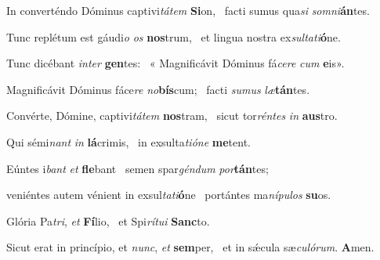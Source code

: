 \item In converténdo Dóminus captivi\textit{tátem} \textbf{Si}on,~\psstar{} facti sumus qua\textit{si} \textit{somni}\textbf{án}tes.

\item Tunc replétum est gáudi\textit{o} \textit{os} \textbf{nos}trum,~\psstar{} et lingua nostra ex\textit{sultati}\textbf{ó}ne.

\item Tunc dicébant \textit{inter} \textbf{gen}tes:~\psstar{} « Magnificávit Dóminus fá\textit{cere} \textit{cum} \textbf{e}is».

\item Magnificávit Dóminus fáce\textit{re} \textit{no}\textbf{bís}cum;~\psstar{} facti \textit{sumus} \textit{læ}\textbf{tán}tes.

\item Convérte, Dómine, captivi\textit{tátem} \textbf{nos}tram,~\psstar{} sicut tor\textit{réntes} \textit{in} \textbf{aus}tro.

\item Qui sémi\textit{nant} \textit{in} \textbf{lá}crimis,~\psstar{} in exsulta\textit{tióne} \textbf{me}tent.

\item Eúntes i\textit{bant} \textit{et} \textbf{fle}bant~\psstar{} semen spar\textit{géndum} \textit{por}\textbf{tán}tes;

\item veniéntes autem vénient in exsul\textit{tati}\textbf{ó}ne~\psstar{} portántes ma\textit{nípulos} \textbf{su}os.

\item Glória Pa\textit{tri}, \textit{et} \textbf{Fí}lio,~\psstar{} et Spi\textit{rítui} \textbf{Sanc}to.

\item Sicut erat in princípio, et \textit{nunc}, \textit{et} \textbf{sem}per,~\psstar{} et in sǽcula sæ\textit{culórum}. \textbf{A}men.
